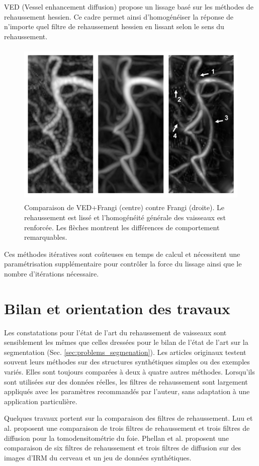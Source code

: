 VED \cite{Manniesing2006_VED} (Vessel enhancement diffusion) propose un lissage basé sur les méthodes de rehaussement hessien. Ce cadre permet ainsi d'homogénéiser la réponse de n'importe quel filtre de rehaussement hessien en lissant selon le sens du rehaussement.
\begin{figure}[!ht]
  \centering
  \includegraphics[height=8cm]{Images/VED.png}
  \caption{Comparaison de VED+Frangi (centre) contre Frangi (droite). Le rehaussement est lissé et l'homogénéité générale des vaisseaux est renforcée. Les flèches montrent les différences de comportement remarquables.}
  \label{fig:custom_fig}
\end{figure}

Ces méthodes itératives sont coûteuses en temps de calcul et nécessitent une paramétrisation supplémentaire pour contrôler la force du lissage ainsi que le nombre d'itérations nécessaire.
\section{Bilan et orientation des travaux}
\label{sec:EA:bilan}
Les constatations pour l'état de l'art du rehaussement de vaisseaux sont sensiblement les mêmes que celles dressées pour le bilan de l'état de l'art sur la segmentation (Sec. \ref{sec:problems_segmenation}). Les articles originaux testent souvent leurs méthodes sur des structures synthétiques simples ou des exemples variés. Elles sont toujours comparées à deux à quatre autres méthodes. Lorsqu'ils sont utilisées sur des données réelles, les filtres de rehaussement sont largement appliqués avec les paramètres recommandés par l'auteur, sans adaptation à une application particulière.

Quelques travaux portent sur la comparaison des filtres de rehaussement. Luu et al. \cite{Luu2015_liver_vesselness_comparison} proposent une comparaison de trois filtres de rehaussement et trois filtres de diffusion pour la tomodensitométrie du foie. Phellan et al. \cite{Phellan2017_Brain_vesselness_comparison} proposent une comparaison de six filtres de rehaussement et trois filtres de diffusion sur des images d'IRM du cerveau et un jeu de données synthétiques.

